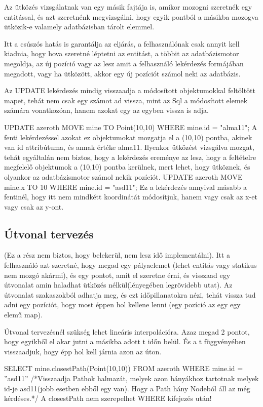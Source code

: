 Az ütközés vizsgálatnak van egy másik fajtája is, amikor mozogni szeretnék egy entitással, és azt szeretnénk megvizsgálni, hogy egyik pontból a másikba mozogva ütközik-e valamely adatbázisban tárolt elemmel.

Itt a csúszós hatás is garantálja az eljárás, a felhasználónak csak annyit kell kiadnia, hogy hova szeretné léptetni az entitást, a többit az adatbázismotor megoldja, az új pozíció vagy az lesz amit a felhasználó lekérdezés formájában megadott, vagy ha ütközött, akkor egy új pozíciót számol neki az adatbázis.

Az UPDATE lekérdezés mindig visszaadja a módosított objektumokkal feltöltött mapet, tehát nem csak egy számot ad vissza, mint az Sql a módosított elemek számára vonatkozóan, hanem azokat egy az egyben vissza is adja.

UPDATE azeroth MOVE  mine TO Point(10,10) WHERE mine.id = "alma11"; 
A fenti lekérdezéssel azokat ez objektumokat mozgatja el a (10,10) pontba, akinek van id attribútuma, és annak értéke alma11. Ilyenkor ütközést vizsgálva mozgat, tehát egyáltalán nem biztos, hogy a lekérdezés ereménye az lesz, hogy a feltételre megfelelő objektumok a (10,10) pontba kerülnek, mert lehet, hogy ütköznek, és olyankor az adatbázismotor számol nekik pozíciót.
UPDATE azeroth MOVE  mine.x TO 10 WHERE mine.id = "asd11"; 
Ez a lekérdezés annyival másabb a fentinél, hogy itt nem mindkétt koordinátát módosítjuk, hanem vagy csak az x-et vagy csak az y-ont.

\subsection{Útvonal tervezés}

(Ez a rész nem biztos, hogy belekerül, nem lesz idő implementálni). Itt a felhasználó azt szeretné, hogy megad egy pályaelemet (lehet entitás vagy statikus nem mozgó akármi), és egy pontot, amit el szeretne érni, és visszaad egy útvonalat amin haladhat ütközés nélkül(lényegében legrövidebb utat). Az útvonalat szakaszokból adhatja meg, és ezt időpillanatokra nézi, tehát vissza tud adni egy pozíciót, hogy most éppen hol kellene lenni (egy pozíció az egy egy elemű map).

Útvonal tervezésnél szükség lehet lineáris interpolációra. Azaz megad 2 pontot, hogy egyikből el akar jutni a másikba adott t időn belül. És a t függvényében visszaadjuk, hogy épp hol kell járnia azon az úton.

SELECT mine.closestPath(Point(10,10)) FROM azeroth WHERE mine.id = ”asd11”
/*Visszaadja Pathok halmazát, melyek azon bányákhoz tartotnak melyek id-je asd11(jobb esetben ebből egy van). Hogy a Path hány Nodeból áll az még kérdéses.*/
A closestPath nem szerepelhet WHERE kifejezés után!

